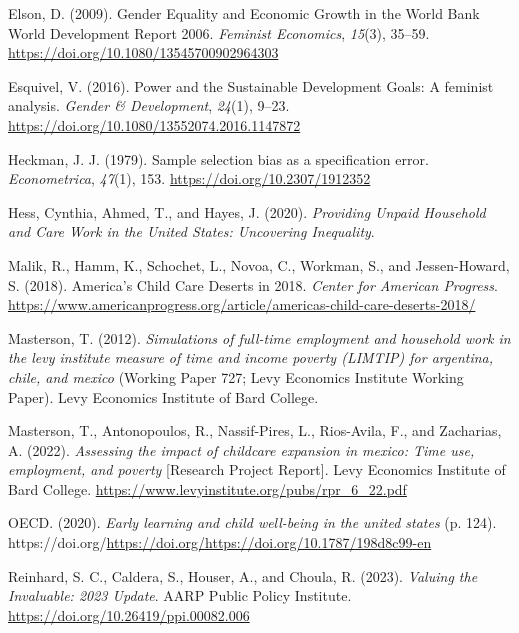 \documentclass[
  11pt,
]{article}
\newlength{\cslhangindent}
\newenvironment{CSLReferences}[2] %
 {\begin{list}{}{%
  \setlength{\itemindent}{0pt}
  \setlength{\leftmargin}{0pt}
  \setlength{\parsep}{0pt}
  \ifodd #1
   \setlength{\leftmargin}{\cslhangindent}
   \setlength{\itemindent}{-1\cslhangindent}
  \fi
  \setlength{\itemsep}{#2\baselineskip}}}
 {\end{list}}
\begin{document}
\begin{CSLReferences}{1}{0}
Elson, D. (2009). Gender {Equality} and {Economic} {Growth} in the
{World} {Bank} {World} {Development} {Report} 2006. \emph{Feminist
Economics}, \emph{15}(3), 35--59.
\url{https://doi.org/10.1080/13545700902964303}

Esquivel, V. (2016). Power and the {Sustainable} {Development} {Goals}:
A feminist analysis. \emph{Gender \& Development}, \emph{24}(1), 9--23.
\url{https://doi.org/10.1080/13552074.2016.1147872}

Heckman, J. J. (1979). Sample selection bias as a specification error.
\emph{Econometrica}, \emph{47}(1), 153.
\url{https://doi.org/10.2307/1912352}

Hess, Cynthia, Ahmed, T., and Hayes, J. (2020). \emph{Providing {Unpaid}
{Household} and {Care} {Work} in the {United} {States}: {Uncovering}
{Inequality}}.

Malik, R., Hamm, K., Schochet, L., Novoa, C., Workman, S., and
Jessen-Howard, S. (2018). America's {Child} {Care} {Deserts} in 2018.
\emph{Center for American Progress}.
\url{https://www.americanprogress.org/article/americas-child-care-deserts-2018/}

Masterson, T. (2012). \emph{Simulations of full-time employment and
household work in the levy institute measure of time and income poverty
(LIMTIP) for argentina, chile, and mexico} (Working Paper 727; Levy
Economics Institute Working Paper). Levy Economics Institute of Bard
College.

Masterson, T., Antonopoulos, R., Nassif-Pires, L., Rios-Avila, F., and
Zacharias, A. (2022). \emph{Assessing the impact of childcare expansion
in mexico: Time use, employment, and poverty} {[}Research Project
Report{]}. Levy Economics Institute of Bard College.
\url{https://www.levyinstitute.org/pubs/rpr_6_22.pdf}

OECD. (2020). \emph{Early learning and child well-being in the united
states} (p. 124).
https://doi.org/\url{https://doi.org/https://doi.org/10.1787/198d8c99-en}

Reinhard, S. C., Caldera, S., Houser, A., and Choula, R. (2023).
\emph{Valuing the {Invaluable}: 2023 {Update}}. AARP Public Policy
Institute. \url{https://doi.org/10.26419/ppi.00082.006}


\end{CSLReferences}
\end{document}
